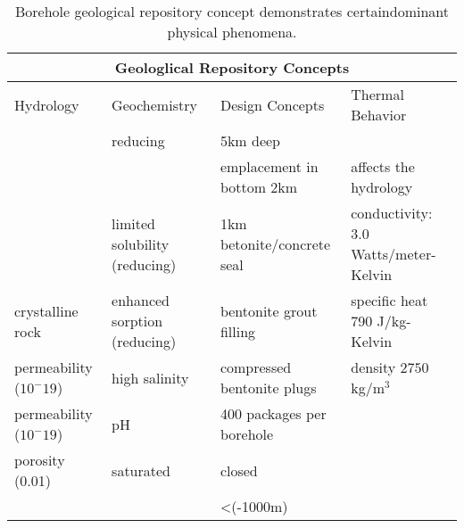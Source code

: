 %
\begin{table}
  \centering
  \footnotesize{
  \begin{tabular}{|l|l|l|l|}
    \multicolumn{4}{c}{\textbf{Geologlical Repository Concepts}}\\
    \hline
    Hydrology & Geochemistry & Design Concepts & Thermal Behavior \\ 
    \hline
    &reducing&5km deep&\\
    &&emplacement in bottom 2km&affects the hydrology\\
    &limited solubility (reducing)&1km betonite/concrete seal &conductivity: 3.0 Watts/meter-Kelvin\\
    crystalline rock&enhanced sorption (reducing)&bentonite grout filling&specific heat 790 J/kg-Kelvin\\
    permeability ($10^-19$)&high salinity&compressed bentonite plugs&density $2750 $kg/m$^3$\\
    permeability ($10^-19$)&pH&400 packages per borehole&\\
    porosity (0.01)&saturated&closed&\\
    &&<(-1000m)&\\
    \hline
  \end{tabular}
  \caption[Borehole Repository Features]{Borehole geological repository 
  concept demonstrates certaindominant physical phenomena. }
  \label{tab:borehole_tab}
  }
\end{table}


